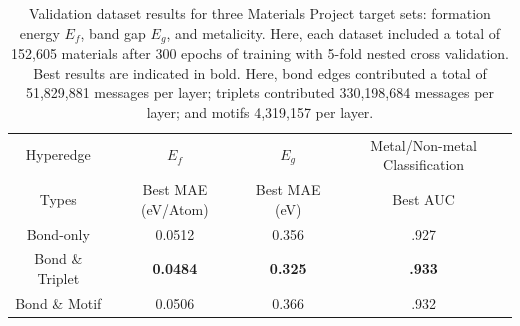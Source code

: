 \documentclass[10pt,a4paper,twocolumn]{article}
\begin{document}
\begin{table}
	\begin{tabular*}{\textwidth}{@{\extracolsep{\fill}}cccc}
		\hline
		Hyperedge & $E_f$ & $E_g$ & Metal/Non-metal Classification \\
		Types & Best MAE (eV/Atom) & Best MAE (eV) & Best AUC \\
		\hline
		Bond-only & 0.0512 & 0.356 & .927 \\
		Bond \& Triplet &  \textbf{0.0484} & \textbf{0.325 } & \textbf{.933}\\
		Bond \& Motif &  0.0506 & 0.366 & .932\\
		\hline
	\end{tabular*}
	\caption{Validation dataset results for three Materials Project target sets: formation energy $E_f$, band gap $E_g$, and metalicity. Here, each dataset included a total of 152,605 materials after 300 epochs of training with 5-fold nested cross validation. Best results are indicated in bold. Here, bond edges contributed a total of 51,829,881 messages per layer; triplets contributed 330,198,684 messages per layer; and motifs 4,319,157 per layer.}\label{fig:mp_table}
\end{table}





\end{document}

